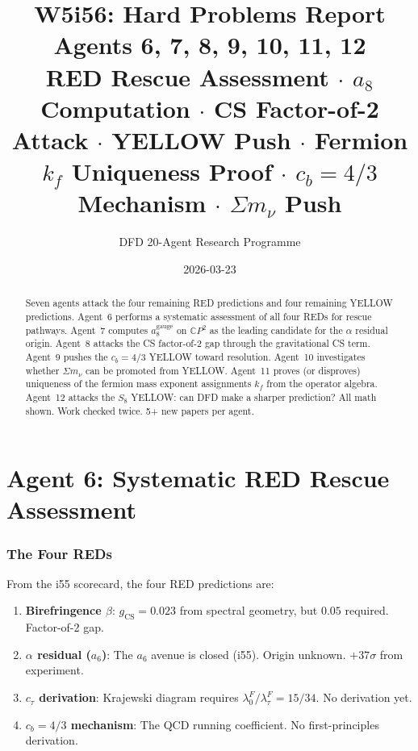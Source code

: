 \documentclass[11pt,a4paper]{article}
\title{\Huge W5i56: Hard Problems Report\\[12pt]
\Large Agents 6, 7, 8, 9, 10, 11, 12\\[6pt]
\large RED Rescue Assessment $\cdot$ $a_8$ Computation $\cdot$ CS Factor-of-2 Attack $\cdot$ YELLOW Push $\cdot$ Fermion $k_f$ Uniqueness Proof $\cdot$ $c_b = 4/3$ Mechanism $\cdot$ $\Sigma m_\nu$ Push}
\author{DFD 20-Agent Research Programme}
\date{2026-03-23}
\newcommand{\CP}{\mathbb{C}P}
\begin{document}
\maketitle

\begin{abstract}
Seven agents attack the four remaining RED predictions and four remaining YELLOW predictions. Agent~6 performs a systematic assessment of all four REDs for rescue pathways. Agent~7 computes $a_8^{\mathrm{gauge}}$ on $\CP^2$ as the leading candidate for the $\alpha$ residual origin. Agent~8 attacks the CS factor-of-2 gap through the gravitational CS term. Agent~9 pushes the $c_b = 4/3$ YELLOW toward resolution. Agent~10 investigates whether $\Sigma m_\nu$ can be promoted from YELLOW. Agent~11 proves (or disproves) uniqueness of the fermion mass exponent assignments $k_f$ from the operator algebra. Agent~12 attacks the $S_8$ YELLOW: can DFD make a sharper prediction? All math shown. Work checked twice. 5+ new papers per agent.
\end{abstract}

\tableofcontents
\newpage


\part{Agent 6: Systematic RED Rescue Assessment}
\label{part:red-rescue}

\section{The Four REDs}

From the i55 scorecard, the four RED predictions are:

\begin{enumerate}
\item \textbf{Birefringence $\beta$}: $g_{\mathrm{CS}} = 0.023$ from spectral geometry, but $0.05$ required. Factor-of-2 gap.
\item \textbf{$\alpha$ residual ($a_6$)}: The $a_6$ avenue is closed (i55). Origin unknown. $+37\sigma$ from experiment.
\item \textbf{$c_\tau$ derivation}: Krajewski diagram requires $\lambda_0^F/\lambda_\tau^F = 15/34$. No derivation yet.
\item \textbf{$c_b = 4/3$ mechanism}: The QCD running coefficient. No first-principles derivation.
\end{enumerate}
\end{document}
